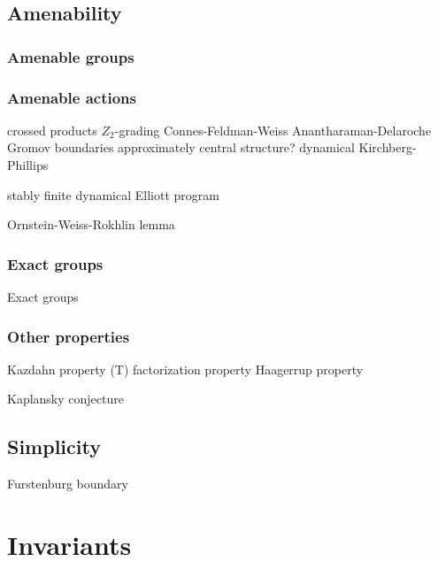 \documentclass{../../large}
\begin{document}
\chapter{Amenability}


\section{Amenable groups}


\section{Amenable actions}
crossed products
$Z_2$-grading
Connes-Feldman-Weiss
Anantharaman-Delaroche
Gromov boundaries
approximately central structure?
dynamical Kirchberg-Phillips

stably finite
dynamical Elliott program

Ornstein-Weiss-Rokhlin lemma

\section{Exact groups}
Exact groups

\section{Other properties}
Kazdahn property (T)
factorization property
Haagerrup property


Kaplansky conjecture












\chapter{Simplicity}


Furstenburg boundary



















\part{Invariants}
\end{document}
